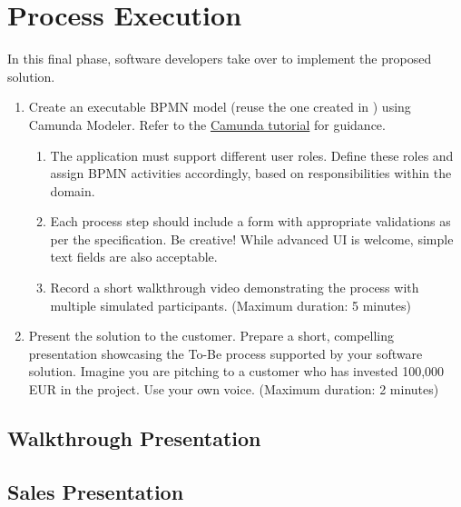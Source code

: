 \chapter{Process Execution}


In this final phase, software developers take over to implement the proposed solution.

\begin{enumerate}
    \item Create an executable BPMN model (reuse the one created in \label{sec:to-be}) using Camunda Modeler. Refer to the \href{https://moodle-vyuka.cvut.cz/pluginfile.php/893298/mod_resource/content/4/How%20to%20run%20Camunda%20Modeler.pdf}{Camunda tutorial} for guidance.
    \begin{enumerate}
        \item The application must support different user roles. Define these roles and assign BPMN activities accordingly, based on responsibilities within the domain.
        \item Each process step should include a form with appropriate validations as per the specification. Be creative! While advanced UI is welcome, simple text fields are also acceptable.
        \item Record a short walkthrough video demonstrating the process with multiple simulated participants. (Maximum duration: 5 minutes)
    \end{enumerate} 
    \item Present the solution to the customer. Prepare a short, compelling presentation showcasing the To-Be process supported by your software solution. Imagine you are pitching to a customer who has invested 100,000 EUR in the project. Use your own voice. (Maximum duration: 2 minutes)
\end{enumerate}

\section{Walkthrough Presentation}

\section{Sales Presentation}

